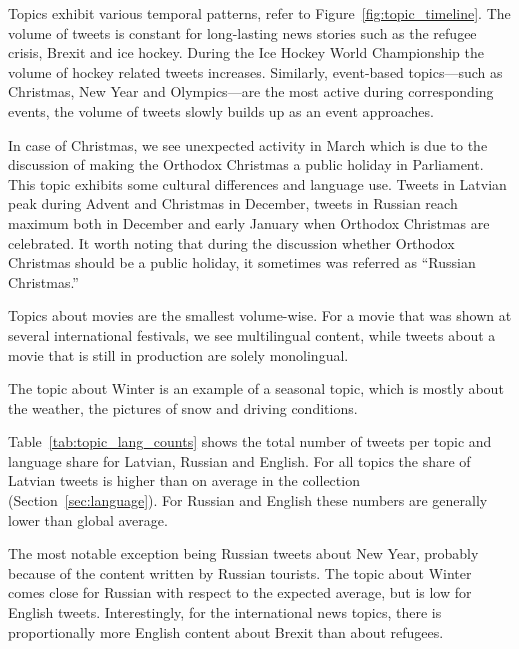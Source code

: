 \documentclass{IOS-Book-Article}
\begin{document}
Topics exhibit various temporal patterns, refer to Figure~\ref{fig:topic_timeline}. The volume of tweets is constant for long-lasting news stories such as the refugee crisis, Brexit and ice hockey.
%
During the Ice Hockey World Championship the volume of hockey related tweets increases. Similarly, event-based topics---such as Christmas, New Year and Olympics---are the most active during corresponding events, the volume of tweets slowly builds up as an event approaches.

In case of Christmas, we see unexpected activity in March which is due to the discussion of making the Orthodox Christmas a public holiday in Parliament. This topic exhibits some cultural differences and language use. Tweets in Latvian peak during Advent and Christmas in December, tweets in Russian reach maximum both in December and early January when Orthodox Christmas are celebrated. It worth noting that during the discussion whether Orthodox Christmas should be a public holiday, it sometimes was referred as ``Russian Christmas.''

Topics about movies are the smallest volume-wise. For a movie that was shown at several international festivals, we see multilingual content, while tweets about a movie that is still in production are solely monolingual.

The topic about Winter is an example of a seasonal topic, which is mostly about the weather, the pictures of snow and driving conditions.

Table~\ref{tab:topic_lang_counts} shows the total number of tweets per topic and language share for Latvian, Russian and English. For all topics the share of Latvian tweets is higher than on average in the collection (Section~\ref{sec:language}). For Russian and English these numbers are generally lower than global average.

The most notable exception being Russian tweets about New Year, probably because of the content written by Russian tourists. The topic about Winter comes close for Russian with respect to the expected average, but is low for English tweets. Interestingly, for the international news topics, there is proportionally more English content about Brexit than about refugees.
\end{document}
